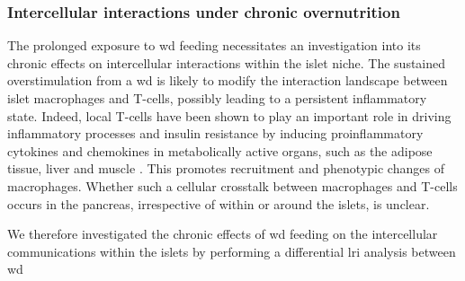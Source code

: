 \subsubsection{\large Intercellular interactions under chronic overnutrition}

The prolonged exposure to \gls{wd} feeding necessitates an investigation into its chronic effects on intercellular interactions within the islet niche. The sustained overstimulation from a \gls{wd} is likely to modify the interaction landscape between islet macrophages and T-cells, possibly leading to a persistent inflammatory state. Indeed, local T-cells have been shown to play an important role in driving inflammatory processes and insulin resistance by inducing proinflammatory cytokines and chemokines in metabolically active organs, such as the adipose tissue, liver and muscle \textbf{\cite{mclaughlin_t-cell_2014,wu_skeletal_2017,park_role_2022}}. This promotes recruitment and phenotypic changes of macrophages. Whether such a cellular crosstalk between macrophages and T-cells occurs in the pancreas, irrespective of within or around the islets, is unclear.\\

\par We therefore investigated the chronic effects of \gls{wd} feeding on the intercellular communications within the islets by performing a differential \gls{lri} analysis between \gls{wd}


